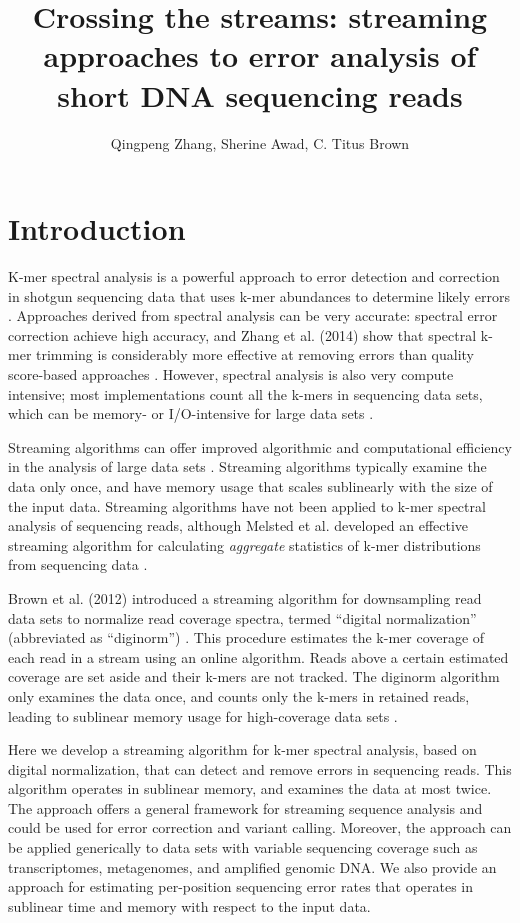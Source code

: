\documentclass{article}
\begin{document}
\title{Crossing the streams: streaming approaches to error analysis of
short DNA sequencing reads}

\author{Qingpeng Zhang, Sherine Awad, C. Titus Brown}
\maketitle

\section{Introduction}

K-mer spectral analysis is a powerful approach to error detection and
correction in shotgun sequencing data that uses k-mer abundances to
determine likely errors \cite{Pevzner2001}.  Approaches derived from
spectral analysis can be very accurate: spectral error correction
achieve high accuracy, and 
Zhang et al. (2014) show that
spectral k-mer trimming is considerably more effective at removing
errors than quality score-based approaches \cite{correctors,Zhang2014}.  However,
spectral analysis is also very compute intensive; most implementations
count all the k-mers in sequencing data sets, which can be memory- or
I/O-intensive for large data sets \cite{Zhang2014}.

Streaming algorithms can offer improved algorithmic and computational
efficiency in the analysis of large data sets \cite{Charikar2004,
  Cormode2005}.  Streaming algorithms typically examine the data only
once, and have memory usage that scales sublinearly with the size of
the input data.  Streaming algorithms have not been applied to k-mer
spectral analysis of sequencing reads, although Melsted et
al. developed an effective streaming algorithm for calculating
{\em aggregate} statistics of k-mer distributions from sequencing data
\cite{Melsted2014}.

Brown et al. (2012) introduced a streaming algorithm for downsampling
read data sets to normalize read coverage spectra, termed ``digital
normalization'' (abbreviated as ``diginorm'') \cite{Brown2012}.  This
procedure estimates the k-mer coverage of each read in a stream using
an online algorithm. Reads above a certain estimated coverage are set
aside and their k-mers are not tracked.  The diginorm algorithm only
examines the data once, and counts only the k-mers in retained reads,
leading to sublinear memory usage for high-coverage data sets
\cite{Brown2012}.

Here we develop a streaming algorithm for k-mer spectral analysis,
based on digital normalization, that can detect and remove errors in
sequencing reads.  This algorithm operates in sublinear memory, and
examines the data at most twice.  The approach offers a general
framework for streaming sequence analysis and could be used for error
correction and variant calling.  Moreover, the approach can be applied
generically to data sets with variable sequencing coverage such as
transcriptomes, metagenomes, and amplified genomic DNA.  We also
provide an approach for estimating per-position sequencing error rates
that operates in sublinear time and memory with respect to the input
data.
\end{document}
